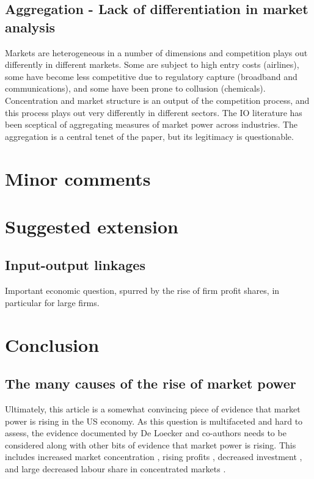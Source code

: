 \documentclass{amsart}
\theoremstyle{definition}
\theoremstyle{remark}
\numberwithin{equation}{section}
\begin{document}
\subsection*{Aggregation - Lack of differentiation in market analysis} Markets are heterogeneous in a number of dimensions and competition plays out differently in different markets. Some are subject to high entry costs (airlines), some have become less  competitive due to regulatory capture (broadband and communications), and some have been prone to collusion (chemicals). Concentration and market structure is an output of the competition process, and this process plays out very differently in different sectors. The IO literature has been sceptical of aggregating measures of market power across industries. The aggregation is a central tenet of the paper, but its legitimacy is questionable.\\


\subsubsection{}

\section{Minor comments}

\section{Suggested extension}

\subsection*{Input-output linkages}

Important economic question, spurred by the rise of firm profit shares, in particular for large firms.\\

\section*{Conclusion}

\subsection{The many causes of the rise of market power} Ultimately, this article is a somewhat convincing piece of evidence that market power is rising in the US economy. As this question is multifaceted and hard to assess, the evidence documented by De Loecker and co-authors needs to be considered along with other bits of evidence that market power is rising. This includes increased market concentration \citep{autor2017concentrating}, rising profits \citep{barkai2019declining}, decreased investment \citep{gutierrez2017investment}, and large decreased labour share in concentrated markets \cite{azar2017labor}.
\end{document}
